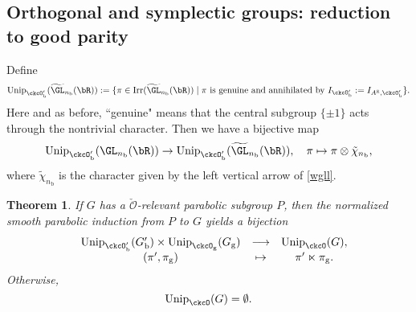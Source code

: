 \documentclass[12pt,a4paper]{amsart}
\newcommand{\CO}{{\mathcal {O}}}
\newcommand{\g}{\mathfrak g}
\newcommand{\R}{\mathbb R}
\numberwithin{equation}{section}
\newtheorem{thm}{Theorem}[section]
\theoremstyle{remark}
\def\Irr{\mathrm{Irr}}
\def\Unip{\mathrm{Unip}}
\def\ckcOpb{\ckcO'_{\mathrm b}}
\begin{document}

 \subsection{Orthogonal and symplectic groups: reduction to good parity}
\label{secrgp0}
Define
 \[
      \Unip_{\ckcOpb}(\widetilde{ \GL}_{n_\mathrm b}(\bR)):=
       \{\pi\in \Irr(\widetilde{ \GL}_{n_\mathrm b}(\bR))\mid \pi \textrm{ is genuine  and annihilated by } I_{\ckcOpb}:= I_{A^\R, \ckcOpb}\}.
       \]
        Here and as before, ``genuine" means that the central subgroup $\{\pm 1\}$ acts through the nontrivial character.  Then we have a bijective map
 \[
    \Unip_{\ckcOpb}(\GL_{n_\mathrm b}(\bR))\rightarrow  \Unip_{\ckcOpb}(\widetilde{ \GL}_{n_\mathrm b}(\bR)), \quad \pi\mapsto \pi\otimes \tilde \chi_{n_\mathrm b},
 \]
 where $\tilde \chi_{n_\mathrm b}$ is the character given by the left vertical arrow of \eqref{wgll}.
\begin{thm}\label{reduction}
 If  $G$ has a $\check \CO$-relevant parabolic subgroup $P$, then the normalized smooth parabolic induction from $P$ to $G$ yields
   a bijection
   \[
    \begin{array}{rccc}
 &\Unip_{\ckcO'_{\mathrm b}}( G'_{\mathrm b}) \times   \Unip_{\ckcO_{\mathrm g}}( G_{\mathrm g})  &         \longrightarrow &\Unip_{\ckcO }(G), \\
                &   (\pi',\pi_\mathrm g) & \mapsto & \pi'\ltimes \pi_\mathrm g.
    \end{array}
 \]
  Otherwise,
  \[
    \Unip_{\ckcO}(G)=\emptyset.
  \]
\end{thm}
\end{document}
